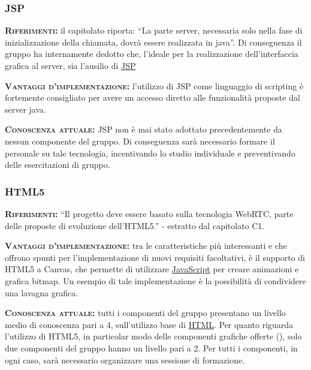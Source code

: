 \subsubsection{JSP}
\begin{description}
	\item{\scshape\bfseries Riferimenti:} il capitolato riporta: ``La parte server, necessaria solo nella fase di inizializzazione della chiamata, dovrà essere realizzata in java''. Di conseguenza il gruppo ha internamente dedotto che, l'ideale per la realizzazione dell'interfaccia grafica al server, sia l'ausilio di \underline{JSP}
	
	\item{\scshape\bfseries Vantaggi d'implementazione:} l'utilizzo di JSP come linguaggio di scripting è fortemente consigliato per avere un accesso diretto alle funzionalità proposte dal server java.

	\item{\scshape\bfseries Conoscenza attuale:} JSP non è mai stato adottato precedentemente da nessun componente del gruppo. Di conseguenza sarà necessario formare il personale su tale tecnologia, incentivando lo studio individuale e preventivando delle esercitazioni di gruppo.
\end{description}

\subsubsection{HTML5}
\begin{description}
	\item{\scshape\bfseries Riferimenti:} ``Il progetto deve essere basato sulla tecnologia WebRTC, parte delle proposte di evoluzione dell'HTML5.'' - estratto dal capitolato C1.
	
	\item{\scshape\bfseries Vantaggi d'implementazione:} tra le caratteristiche più interessanti e che offrono spunti per l'implementazione di nuovi requisiti facoltativi, è il supporto di HTML5 a Canvas, che permette di utilizzare \underline{JavaScript} per creare animazioni e grafica bitmap. Un esempio di tale implementazione è la possibilità di condividere una lavagna grafica.
	
	\item{\scshape\bfseries Conoscenza attuale:} tutti i componenti del gruppo presentano un livello medio di conoscenza pari a 4, sull'utilizzo base di \underline{HTML}. Per quanto riguarda l'utilizzo di HTML5, in particolar modo delle componenti grafiche offerte (), solo due componenti del gruppo hanno un livello pari a 2. Per tutti i componenti, in ogni caso, sarà necessario organizzare una sessione di formazione.
\end{description}

